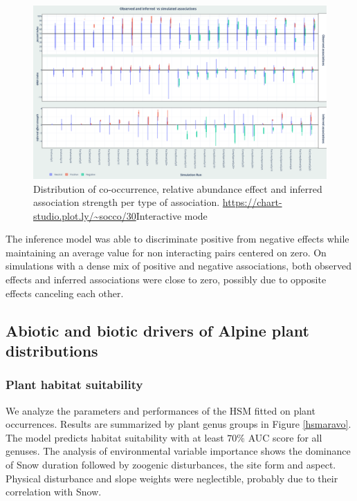 \documentclass[]{article}
\begin{document}
\begin{figure}[h]
	\centering
	\includegraphics[scale=0.25]{patt}
	\caption{Distribution of co-occurrence, relative abundance effect and inferred association strength per type of association. \url{https://chart-studio.plot.ly/~socco/30}{Interactive mode}}
	\label{patterns}
\end{figure}

\noindent The inference model was able to discriminate positive from negative effects while maintaining an average value for non interacting pairs centered on zero. On simulations with a dense mix of positive and negative associations, both observed effects and inferred associations were close to zero, possibly due to opposite effects canceling each other. 

\subsection{Abiotic and biotic drivers of Alpine plant distributions}
\subsubsection{Plant habitat suitability}
We analyze the parameters and performances of the HSM fitted on plant occurrences. Results are summarized by plant genus groups in Figure \ref{hsmaravo}. The model predicts habitat suitability with at least $70\%$ AUC score for all genuses. The analysis of environmental variable importance shows the dominance of Snow duration followed by zoogenic disturbances, the site form and aspect. Physical disturbance and slope weights were neglectible, probably due to their correlation with Snow. 
\end{document}
